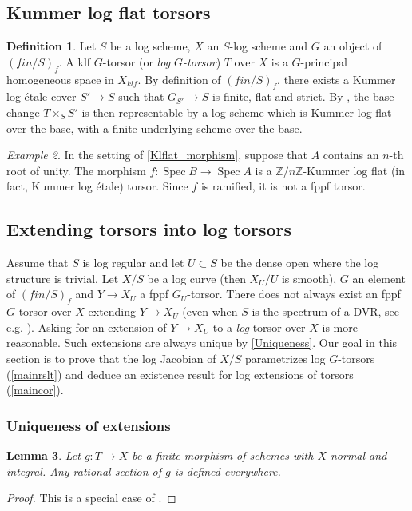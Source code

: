 \documentclass[a4paper,11pt]{amsart} %
\numberwithin{equation}{subsection}
\newcommand{\bb}[1]{{\mathbb{#1}}}
\newcommand{\Spec}{\operatorname{Spec}}
\theoremstyle{definition}
\newtheorem{definition}{Definition}[section]
\theoremstyle{plain}%
\newtheorem{lemma}[definition]{Lemma}
\theoremstyle{remark}
\newtheorem{example}[definition]{Example}
\begin{document}
\subsection{Kummer log flat torsors}
\begin{definition}
    Let $S$ be a log scheme, $X$ an $S$-log scheme and $G$ an object of $(fin/S)_f$. A klf $G$-torsor (or \emph{log $G$-torsor}) $T$ over $X$ is a $G$-principal homogeneous space in $X_{klf}$. By definition of $(fin/S)_f$, there exists a Kummer log étale cover $S' \to S$ such that $G_{S'} \to S$ is finite, flat and strict. By \cite[Theorem 9.1]{katoLogStructuresII}, the base change $T\times_S S'$ is then representable by a log scheme which is Kummer log flat over the base, with a finite underlying scheme over the base.\\ 
\end{definition}
\begin{example}
In the setting of \ref{Klflat_morphism}, suppose that $A$ contains an $n$-th root of unity. The morphism $f \colon \Spec B \to \Spec A$ is a $\bb Z/n\bb Z$-Kummer log flat (in fact, Kummer log \'etale) torsor. Since $f$ is ramified, it is not a fppf torsor.
\end{example}

\subsection{Extending torsors into log torsors}
Assume that $S$ is log regular and let $U\subset S$ be the dense open where the log structure is trivial. Let $X/S$ be a log curve (then $X_U/U$ is smooth), $G$ an element of $(fin/S)_f$ and $Y \to X_U$ a fppf $G_U$-torsor. There does not always exist an fppf $G$-torsor over $X$ extending $Y \to X_U$ (even when $S$ is the spectrum of a DVR, see e.g. \cite[\S 4.1]{Sara}). Asking for an extension of $Y \to X_U$ to a \emph{log} torsor over $X$ is more reasonable. Such extensions are always unique by \ref{Uniqueness}. Our goal in this section is to prove that the log Jacobian of $X/S$ parametrizes log $G$-torsors (\ref{mainrslt}) and deduce an existence result for log extensions of torsors (\ref{maincor}).

\subsubsection{Uniqueness of extensions}
\begin{lemma}\label{uniq}
Let $g: T \to X$ be a finite morphism of schemes with $X$ normal and integral. Any rational section of $g$ is defined everywhere.
\end{lemma}
\begin{proof}
    This is a special case of \cite[Corollary 6.1.15]{Groth}.
\end{proof}
\end{document}
